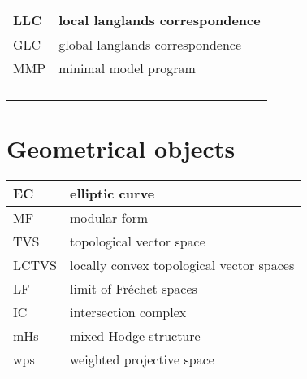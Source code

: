 \documentclass{amsart}
\numberwithin{equation}{section}
\theoremstyle{plain}
\numberwithin{equation}{section}
\theoremstyle{remark}
\begin{document}
\begin{longtable}{l|l}
\hline
LLC & local langlands correspondence \\ \hline
GLC & global langlands correspondence  \\ \hline
MMP & minimal model program\\ \hline
 & \\ \hline
 & \\ \hline
 & \\ \hline
 & \\ \hline
\end{longtable}

\section{Geometrical objects}
\begin{longtable}{l|l}
\hline
EC & elliptic curve \\ \hline
MF & modular form  \\ \hline
TVS & topological vector space\\ \hline
LCTVS &  locally convex topological vector spaces\\ \hline
LF & limit of Fréchet spaces\\ \hline
IC & intersection complex\\ \hline
mHs & mixed Hodge structure\\ \hline
wps & weighted projective space\\ \hline
\end{longtable}
\end{document}
